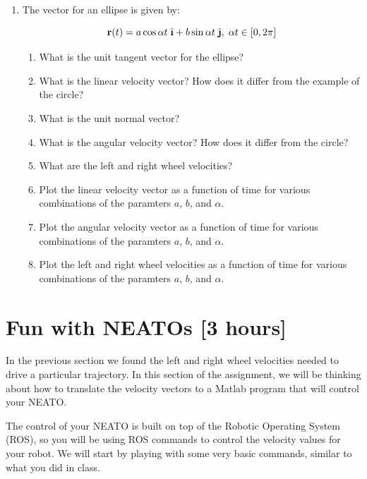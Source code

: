 \documentclass[M3_Night2_Solutions]{subfiles}
\begin{document}
\begin{enumerate}[series=exercises, label=\textbf{Exercise} (\arabic*)]
\item The vector for an ellipse is given by:

\[ \r(t) = a \cos \alpha t \; \ihat + b \sin \alpha t \; \jhat, \; \alpha t \in [0,2 \pi] \]

\begin{enumerate}
\item What is the unit tangent vector for the ellipse?

\item What is the linear velocity vector? How does it differ from the example of the circle?

\item What is the unit normal vector?

\item What is the angular velocity vector? How does it differ from the circle?

\item What are the left and right wheel velocities?

\item Plot the linear velocity vector as a function of time for various combinations of the paramters $a$, $b$, and $\alpha$.

\item  Plot the angular velocity vector as a function of time for various combinations of the paramters $a$, $b$, and $\alpha$.

\item  Plot the left and right wheel velocities as a function of time for various combinations of the paramters $a$, $b$, and $\alpha$.

\end{enumerate}

\end{enumerate}

\section {Fun with NEATOs [3 hours]}

In the previous section we found the left and right wheel velocities needed to drive a particular trajectory. In this section of the assignment, we will be thinking about how to translate the velocity vectors to a Matlab program that will control your NEATO.

The control of your NEATO is built on top of the Robotic Operating System (ROS), so you will be using ROS commands to control the velocity values for your robot. We will start by playing with some very basic commands, similar to what you did in class. 
\end{document}

